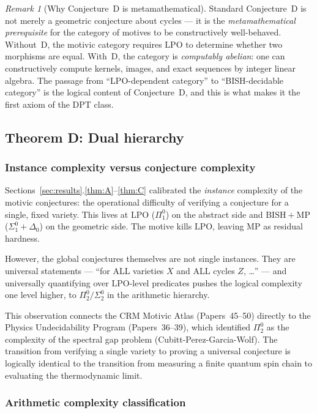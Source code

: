 \documentclass[11pt]{article}
\theoremstyle{definition}
\theoremstyle{remark}
\newtheorem{remark}[theorem]{Remark}
\newcommand{\LPO}{\mathrm{LPO}}
\newcommand{\MP}{\mathrm{MP}}
\newcommand{\BISH}{\mathrm{BISH}}
\newcommand{\CRM}{\mathrm{CRM}}
\begin{document}
\begin{remark}[Why Conjecture~D is metamathematical]
Standard Conjecture~D is not merely a geometric conjecture about cycles --- it is the \emph{metamathematical prerequisite} for the category of motives to be constructively well-behaved. Without~D, the motivic category requires $\LPO$ to determine whether two morphisms are equal. With~D, the category is \emph{computably abelian}: one can constructively compute kernels, images, and exact sequences by integer linear algebra. The passage from ``LPO-dependent category'' to ``BISH-decidable category'' is the logical content of Conjecture~D, and this is what makes it the first axiom of the DPT class.
\end{remark}

\subsection{Theorem D: Dual hierarchy}

\subsubsection{Instance complexity versus conjecture complexity}

Sections~\ref{sec:results}.\ref{thm:A}--\ref{thm:C} calibrated the \emph{instance} complexity of the motivic conjectures: the operational difficulty of verifying a conjecture for a single, fixed variety. This lives at $\LPO$ ($\Pi_1^0$) on the abstract side and $\BISH + \MP$ ($\Sigma_1^0 + \Delta_0$) on the geometric side. The motive kills $\LPO$, leaving $\MP$ as residual hardness.

However, the global conjectures themselves are not single instances. They are universal statements --- ``for ALL varieties $X$ and ALL cycles $Z$, \ldots'' --- and universally quantifying over $\LPO$-level predicates pushes the logical complexity one level higher, to $\Pi_2^0 / \Sigma_2^0$ in the arithmetic hierarchy.

This observation connects the $\CRM$ Motivic Atlas (Papers~45--50) directly to the Physics Undecidability Program (Papers~36--39), which identified $\Pi_2^0$ as the complexity of the spectral gap problem (Cubitt-Perez-Garcia-Wolf). The transition from verifying a single variety to proving a universal conjecture is logically identical to the transition from measuring a finite quantum spin chain to evaluating the thermodynamic limit.

\subsubsection{Arithmetic complexity classification}
\end{document}
